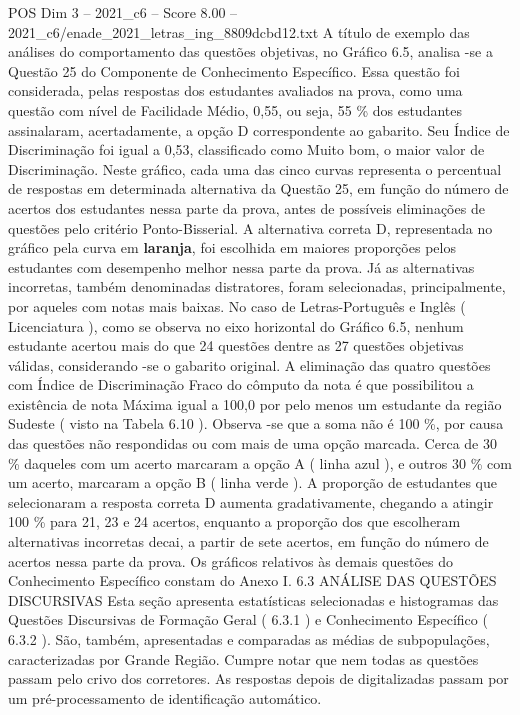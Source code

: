 \begin{textsample}{POS Dim 3 – 2021\_c6 – Score 8.00 – 2021\_c6/enade\_2021\_letras\_ing\_8809dcbd12.txt}
A título de exemplo das análises do comportamento das questões objetivas, no Gráfico 6.5, analisa -se a Questão 25 do Componente de Conhecimento Específico.
Essa questão foi considerada, pelas respostas dos estudantes avaliados na prova, como uma questão com nível de Facilidade Médio, 0,55, ou seja, 55 \% dos estudantes assinalaram, acertadamente, a opção D correspondente ao gabarito.
Seu Índice de Discriminação foi igual a 0,53, classificado como Muito bom, o maior valor de Discriminação.
Neste gráfico, cada uma das cinco curvas representa o percentual de respostas em determinada alternativa da Questão 25, em função do número de acertos dos estudantes nessa parte da prova, antes de possíveis eliminações de questões pelo critério Ponto-Bisserial.
A alternativa correta D, representada no gráfico pela curva em \textbf{laranja}, foi escolhida em maiores proporções pelos estudantes com desempenho melhor nessa parte da prova.
Já as alternativas incorretas, também denominadas distratores, foram selecionadas, principalmente, por aqueles com notas mais baixas.
No caso de Letras-Português e Inglês ( Licenciatura ), como se observa no eixo horizontal do Gráfico 6.5, nenhum estudante acertou mais do que 24 questões dentre as 27 questões objetivas válidas, considerando -se o gabarito original.
A eliminação das quatro questões com Índice de Discriminação Fraco do cômputo da nota é que possibilitou a existência de nota Máxima igual a 100,0 por pelo menos um estudante da região Sudeste ( visto na Tabela 6.10 ).
Observa -se que a soma não é 100 \%, por causa das questões não respondidas ou com mais de uma opção marcada.
Cerca de 30 \% daqueles com um acerto marcaram a opção A ( linha azul ), e outros 30 \% com um acerto, marcaram a opção B ( linha verde ).
A proporção de estudantes que selecionaram a resposta correta D aumenta gradativamente, chegando a atingir 100 \% para 21, 23 e 24 acertos, enquanto a proporção dos que escolheram alternativas incorretas decai, a partir de sete acertos, em função do número de acertos nessa parte da prova.
Os gráficos relativos às demais questões do Conhecimento Específico constam do Anexo I. 6.3 ANÁLISE DAS QUESTÕES DISCURSIVAS Esta seção apresenta estatísticas selecionadas e histogramas das Questões Discursivas de Formação Geral ( 6.3.1 ) e Conhecimento Específico ( 6.3.2 ).
São, também, apresentadas e comparadas as médias de subpopulações, caracterizadas por Grande Região.
Cumpre notar que nem todas as questões passam pelo crivo dos corretores.
As respostas depois de digitalizadas passam por um pré-processamento de identificação automático.

\end{textsample}
